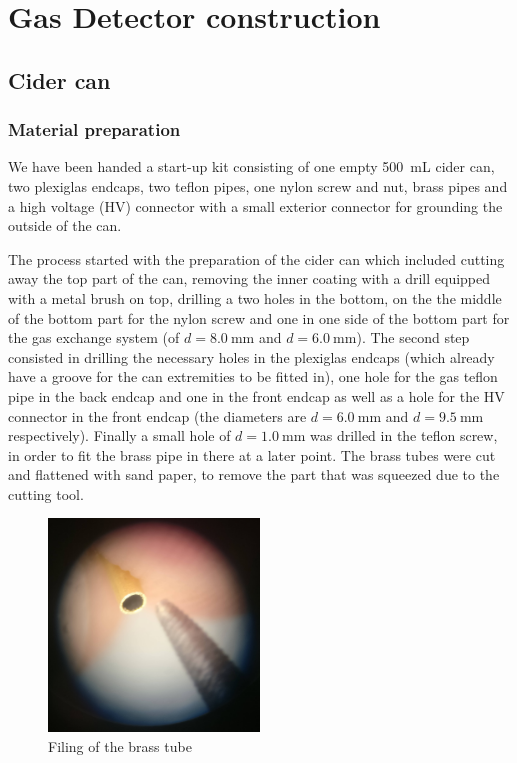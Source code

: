 \section{Gas Detector construction}
\label{sec:construction}

\subsection{Cider can}
\subsubsection{Material preparation}
We have been handed a start-up kit consisting of one empty \SI{500}{\milli\liter}
cider can, two plexiglas endcaps, two teflon pipes, one nylon screw and nut,
brass pipes and a high voltage (HV) connector with a small exterior connector for
grounding the outside of the can.

The process started with the preparation of the cider can which included cutting
away the top part of the can, removing the inner coating with a drill equipped with a
metal brush on top, drilling a two holes in the bottom, on the the middle of the
bottom part for the nylon screw and one in one side of the bottom part for the
gas exchange system (of $d = \SI{8.0}{\milli\meter}$ and $d =
\SI{6.0}{\milli\meter}$). The second step consisted in drilling the necessary
holes in the plexiglas endcaps (which already have a groove for the can
extremities to be fitted in), one hole for the gas teflon pipe in the back
endcap and one in the front endcap as well as a hole for the HV connector in the
front endcap (the diameters are $d = \SI{6.0}{\milli\meter}$ and $d =
\SI{9.5}{\milli\meter}$ respectively). Finally a small hole of $d =
\SI{1.0}{\milli\meter}$ was drilled in the teflon screw, in order to fit the
brass pipe in there at a later point. The brass tubes were cut and flattened
with sand paper, to remove the part that was squeezed due to the cutting tool.

\begin{figure}[h]
  \centering
  \includegraphics[width=0.5\textwidth]{./graphics/brass_file.jpg}
  \caption{Filing of the brass tube}
  \label{fig:brass_file}
\end{figure}


